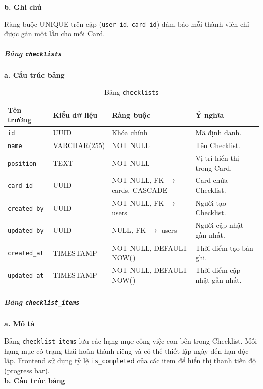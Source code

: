 \hspace{1.5em}\textbf{b. Ghi chú}

Ràng buộc UNIQUE trên cặp (\texttt{user\_id}, \texttt{card\_id}) đảm bảo mỗi thành viên chỉ được gán một lần cho mỗi Card.


\subparagraph{Bảng \texttt{checklists}} \mbox{}

\hspace{1.5em}\textbf{a. Cấu trúc bảng}

\begin{table}[H]
\centering
\begin{tabular}{|p{3cm}|p{3.5cm}|p{3.5cm}|p{4cm}|}
\hline
\textbf{Tên trường} & \textbf{Kiểu dữ liệu} & \textbf{Ràng buộc} & \textbf{Ý nghĩa} \\
\hline
\texttt{id} & UUID & Khóa chính & Mã định danh. \\
\hline
\texttt{name} & VARCHAR(255) & NOT NULL & Tên Checklist. \\
\hline
\texttt{position} & TEXT & NOT NULL & Vị trí hiển thị trong Card. \\
\hline
\texttt{card\_id} & UUID & NOT NULL, FK $\rightarrow$ cards, CASCADE & Card chứa Checklist. \\
\hline
\texttt{created\_by} & UUID & NOT NULL, FK $\rightarrow$ users & Người tạo Checklist. \\
\hline
\texttt{updated\_by} & UUID & NULL, FK $\rightarrow$ users & Người cập nhật gần nhất. \\
\hline
\texttt{created\_at} & TIMESTAMP & NOT NULL, DEFAULT NOW() & Thời điểm tạo bản ghi. \\
\hline
\texttt{updated\_at} & TIMESTAMP & NOT NULL, DEFAULT NOW() & Thời điểm cập nhật gần nhất. \\
\hline
\end{tabular}
\caption{Bảng \texttt{checklists}}
\label{tab:db_checklists}
\end{table}


\subparagraph{Bảng \texttt{checklist\_items}} \mbox{}

\hspace{1.5em}\textbf{a. Mô tả}

Bảng \texttt{checklist\_items} lưu các hạng mục công việc con bên trong Checklist. Mỗi hạng mục có trạng thái hoàn thành riêng và có thể thiết lập ngày đến hạn độc lập. Frontend sử dụng tỷ lệ \texttt{is\_completed} của các item để hiển thị thanh tiến độ (progress bar).\\

\hspace{1.5em}\textbf{b. Cấu trúc bảng}


